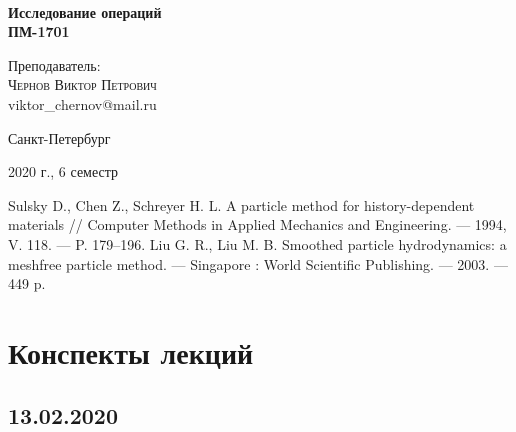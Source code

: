 \documentclass[aps,%
12pt,%
final,%
oneside,
onecolumn,%
musixtex, %
superscriptaddress,%
centertags]{article} %
\theoremstyle{plain}
\begin{document}
\begin{titlepage} 
\begin{center}
 
\textbf{}\\[10.0cm]
\textbf{\LARGE Исследование операций}\\[0.5cm]
\textbf{\Large ПМ-1701} \\[0.2cm]

\begin{center} \large
{Преподаватель:} \\[0.5cm]
\textsc {Чернов Виктор Петрович}\\
{viktor\_chernov@mail.ru}\\
\end{center}
\vfill 

{\large {Санкт-Петербург}} \par
{\large {2020 г., 6 семестр}}
\end{center} 
\end{titlepage}

\begin{thebibliography}{3}
Sulsky D., Chen Z., Schreyer H. L.  A particle method for history-dependent materials // Computer Methods in Applied Mechanics and Engineering. --- 1994, V. 118. --- P. 179--196.
Liu G. R., Liu M. B. Smoothed particle hydrodynamics: a meshfree particle method. --- Singapore : World Scientific Publishing. --- 2003. --- 449 p.
\end{thebibliography}
\tableofcontents
\newpage
\section{Конспекты лекций}
\subsection{13.02.2020} 
\end{document}
